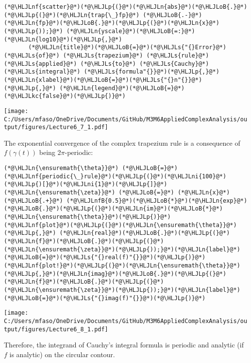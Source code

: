 \documentclass[12pt,landscape]{article}
\newcommand{\HLJLkc}[1]{\textcolor[RGB]{59,151,46}{\textit{#1}}}
\newcommand{\HLJLn}[1]{#1}
\newcommand{\HLJLnf}[1]{\textcolor[RGB]{66,102,213}{#1}}
\newcommand{\HLJLs}[1]{\textcolor[RGB]{201,61,57}{#1}}
\newcommand{\HLJLnfB}[1]{\textcolor[RGB]{59,151,46}{#1}}
\newcommand{\HLJLni}[1]{\textcolor[RGB]{59,151,46}{#1}}
\newcommand{\HLJLoB}[1]{\textcolor[RGB]{102,102,102}{\textbf{#1}}}
\newcommand{\HLJLp}[1]{#1}
\def\cent#1{\begin{center}#1\end{center} }
\begin{document}
{\begin{lstlisting}
(*@\HLJLnf{scatter}@*)(*@\HLJLp{(}@*)(*@\HLJLn{abs}@*)(*@\HLJLoB{.}@*)(*@\HLJLp{(}@*)(*@\HLJLn{trap{\_}fp}@*) (*@\HLJLoB{.-}@*) (*@\HLJLn{fp}@*)(*@\HLJLoB{.}@*)(*@\HLJLp{(}@*)(*@\HLJLn{x}@*)(*@\HLJLp{));}@*) (*@\HLJLn{yscale}@*)(*@\HLJLoB{=:}@*)(*@\HLJLn{log10}@*)(*@\HLJLp{,}@*)
       (*@\HLJLn{title}@*)(*@\HLJLoB{=}@*)(*@\HLJLs{"{}Error}@*) (*@\HLJLs{of}@*) (*@\HLJLs{trapezium}@*) (*@\HLJLs{rule}@*) (*@\HLJLs{applied}@*) (*@\HLJLs{to}@*) (*@\HLJLs{Cauchy}@*) (*@\HLJLs{integral}@*) (*@\HLJLs{formula"{}}@*)(*@\HLJLp{,}@*) (*@\HLJLn{xlabel}@*)(*@\HLJLoB{=}@*)(*@\HLJLs{"{}n"{}}@*)(*@\HLJLp{,}@*) (*@\HLJLn{legend}@*)(*@\HLJLoB{=}@*)(*@\HLJLkc{false}@*)(*@\HLJLp{)}@*)
\end{lstlisting}

\cent{\texttt{[image: C:/Users/mfaso/OneDrive/Documents/GitHub/M3M6AppliedComplexAnalysis/output/figures/Lecture6\_7\_1.pdf]}}

The exponential convergence of the complex trapezium rule is a consequence of $f(\gamma(t))$ being 2\ensuremath{\pi}-periodic:


\begin{lstlisting}
(*@\HLJLn{\ensuremath{\theta}}@*) (*@\HLJLoB{=}@*) (*@\HLJLnf{periodic{\_}rule}@*)(*@\HLJLp{(}@*)(*@\HLJLni{100}@*)(*@\HLJLp{)[}@*)(*@\HLJLni{1}@*)(*@\HLJLp{]}@*)
(*@\HLJLn{\ensuremath{\zeta}}@*) (*@\HLJLoB{=}@*) (*@\HLJLn{x}@*) (*@\HLJLoB{.+}@*) (*@\HLJLnfB{0.5}@*)(*@\HLJLoB{*}@*)(*@\HLJLn{exp}@*)(*@\HLJLoB{.}@*)(*@\HLJLp{(}@*)(*@\HLJLn{im}@*)(*@\HLJLoB{*}@*)(*@\HLJLn{\ensuremath{\theta}}@*)(*@\HLJLp{)}@*)
(*@\HLJLnf{plot}@*)(*@\HLJLp{(}@*)(*@\HLJLn{\ensuremath{\theta}}@*)(*@\HLJLp{,}@*) (*@\HLJLn{real}@*)(*@\HLJLoB{.}@*)(*@\HLJLp{(}@*)(*@\HLJLn{f}@*)(*@\HLJLoB{.}@*)(*@\HLJLp{(}@*)(*@\HLJLn{\ensuremath{\zeta}}@*)(*@\HLJLp{));}@*)(*@\HLJLn{label}@*)(*@\HLJLoB{=}@*)(*@\HLJLs{"{}real(f)"{}}@*)(*@\HLJLp{)}@*)
(*@\HLJLnf{plot!}@*)(*@\HLJLp{(}@*)(*@\HLJLn{\ensuremath{\theta}}@*)(*@\HLJLp{,}@*)(*@\HLJLn{imag}@*)(*@\HLJLoB{.}@*)(*@\HLJLp{(}@*)(*@\HLJLn{f}@*)(*@\HLJLoB{.}@*)(*@\HLJLp{(}@*)(*@\HLJLn{\ensuremath{\zeta}}@*)(*@\HLJLp{));}@*)(*@\HLJLn{label}@*)(*@\HLJLoB{=}@*)(*@\HLJLs{"{}imag(f)"{}}@*)(*@\HLJLp{)}@*)
\end{lstlisting}

\cent{\texttt{[image: C:/Users/mfaso/OneDrive/Documents/GitHub/M3M6AppliedComplexAnalysis/output/figures/Lecture6\_8\_1.pdf]}}

Therefore, the integrand of Cauchy's integral formula is periodic and analytic (if $f$ is analytic) on the circular contour.

}
\end{document}
